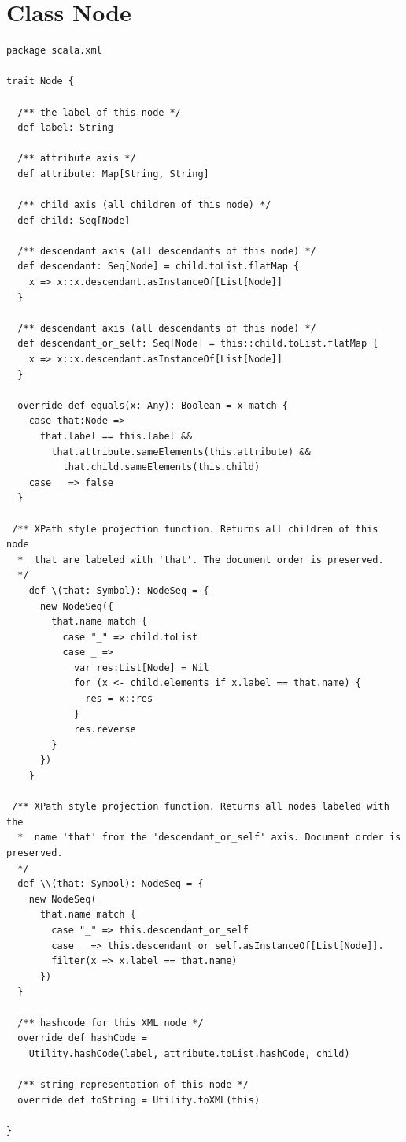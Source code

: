\section{Class Node}\label{cls:Node}
\begin{lstlisting}
package scala.xml 

trait Node {

  /** the label of this node */
  def label: String               

  /** attribute axis */
  def attribute: Map[String, String] 

  /** child axis (all children of this node) */
  def child: Seq[Node]          

  /** descendant axis (all descendants of this node) */
  def descendant: Seq[Node] = child.toList.flatMap { 
    x => x::x.descendant.asInstanceOf[List[Node]] 
  } 

  /** descendant axis (all descendants of this node) */
  def descendant_or_self: Seq[Node] = this::child.toList.flatMap { 
    x => x::x.descendant.asInstanceOf[List[Node]] 
  } 

  override def equals(x: Any): Boolean = x match {
    case that:Node => 
      that.label == this.label && 
        that.attribute.sameElements(this.attribute) && 
          that.child.sameElements(this.child)
    case _ => false
  } 

 /** XPath style projection function. Returns all children of this node
  *  that are labeled with 'that'. The document order is preserved.
  */
    def \(that: Symbol): NodeSeq = {
      new NodeSeq({
        that.name match {
          case "_" => child.toList  
          case _ =>
            var res:List[Node] = Nil 
            for (x <- child.elements if x.label == that.name) {
              res = x::res 
            }
            res.reverse
        }
      }) 
    }

 /** XPath style projection function. Returns all nodes labeled with the 
  *  name 'that' from the 'descendant_or_self' axis. Document order is preserved.
  */
  def \\(that: Symbol): NodeSeq = {
    new NodeSeq(
      that.name match {
        case "_" => this.descendant_or_self 
        case _ => this.descendant_or_self.asInstanceOf[List[Node]].
        filter(x => x.label == that.name) 
      })
  }

  /** hashcode for this XML node */
  override def hashCode = 
    Utility.hashCode(label, attribute.toList.hashCode, child) 

  /** string representation of this node */
  override def toString = Utility.toXML(this) 

}
\end{lstlisting}

